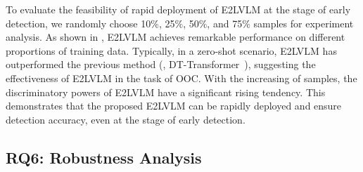 
To evaluate the feasibility of rapid deployment of E2LVLM at the stage of early detection, we randomly choose 10$\%$, 25$\%$, 50$\%$, and 75$\%$ samples for experiment analysis. As shown in , E2LVLM achieves remarkable performance on different proportions of training data. Typically, in a zero-shot scenario, E2LVLM has outperformed the previous method (\eg, DT-Transformer~\cite{papadopoulos2023synthetic}), suggesting the effectiveness of E2LVLM in the task of OOC. With the increasing of samples, the discriminatory powers of E2LVLM have a significant rising tendency. This demonstrates that the proposed E2LVLM can be rapidly deployed and ensure detection accuracy, even at the stage of early detection.

\subsection{RQ6: Robustness Analysis}




